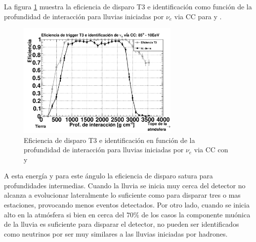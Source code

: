 	La figura \ref{fig:effDG_tr_id} muestra la eficiencia de disparo T3 e identificación como función de la profundidad de interacción para lluvias iniciadas por $\nu_e$ via CC para  y .
	\begin{figure}[h!]
		\begin{center}
			\includegraphics[width=0.7\textwidth]{fig/resultadosAuger/eff_10EeV_85}
			\caption{Eficiencia de disparo T3 e identificación en función de la profundidad de interacción para lluvias iniciadas por $\nu_e$ via CC con  y }
			\label{fig:effDG_tr_id}
		\end{center}
	\end{figure} 
	A esta energía y para este ángulo la eficiencia de disparo satura para profundidades intermedias.
	Cuando la lluvia se inicia muy cerca del detector no alcanza a evolucionar lateralmente lo suficiente como para disparar tres o mas estaciones, provocando menos eventos detectados. 
	Por otro lado, cuando se inicia alto en la atmósfera si bien en cerca del $70\%$ de los casos la componente muónica de la lluvia es suficiente para disparar el detector, no pueden ser identificados como neutrinos por ser muy similares a las lluvias iniciadas por hadrones.
	
